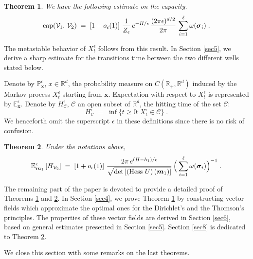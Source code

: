 \documentclass[reqno]{amsart}
\newtheorem{theorem}{Theorem}[section]
\newcounter{as}[section]
\newcommand{\mc}[1]{{\mathcal #1}}
\newcommand{\bb}[1]{{\mathbb #1}}
\newcommand{\bs}[1]{{\boldsymbol #1}}
\newcommand{\<}{\langle}
\renewcommand{\>}{\rangle}
\begin{document}
\begin{theorem}
\label{thmp1}
We have the following estimate on the capacity.
\begin{equation}
\label{cap}
\textup{cap}(\mc{V}_{1},\,\mc{V}_{2})\;=\;\left[1+o_{\epsilon}(1)\right]\,
\frac 1{Z_{\epsilon}}\, e^{-H/\epsilon}\, \frac{(2\pi \epsilon)^{d/2}}{2\pi}\,
\sum_{i=1}^{\ell}\omega(\bs{\sigma}_{i})\;.
\end{equation}
\end{theorem}

The metastable behavior of $X_{t}^{\epsilon}$ follows from this
result. In Section \ref{sec5}, we derive a sharp estimate for the
transitions time between the two different wells stated below.

Denote by $\bb P_\bs x^\epsilon$, $x\in \bb R^d$, the probability
measure on $C(\bb R_+, \bb R^d)$ induced by the Markov process $X
^{\epsilon}_t$ starting from $\bs x$. Expectation with respect to
$X_t^\epsilon$ is represented by $\bb E_\bs x^\epsilon$. Denote by
$H_\mc C^\epsilon$, $\mc C$ an open subset of $\bb R^d$, the hitting
time of the set $\mc C$:
\begin{equation}
\label{hitt}
H_\mc C^\epsilon \;=\; \inf\{t\ge 0 : X_t^\epsilon \in \mc C\}\;.
\end{equation}
We henceforth omit the superscript $\epsilon$ in these definitions
since there is no risk of confusion.

\begin{theorem}
\label{thmp2}
Under the notations above,
\begin{equation}
\label{2-4}
\bb{E}_{\bs{m}_{1}}^\epsilon\left[H_{\mc{V}_{2}}\right]\;=\;
\left[1+o_{\epsilon}(1)\right]\, \frac{2\pi \,
  e^{(H-h_{1})/\epsilon}}
{\sqrt{\det\left[(\text{\rm Hess }U)\, (\bs{m}_{1})\right]}}\,
\Big(\sum_{i=1}^{\ell}\omega(\bs{\sigma}_{i})\Big)^{-1}\;.
\end{equation}
\end{theorem}

The remaining part of the paper is devoted to provide a detailed proof
of Theorems \ref{thmp1} and \ref{thmp2}. In Section \ref{sec4}, we
prove Theorem \ref{thmp1} by constructing vector fields which
approximate the optimal ones for the Dirichlet's and the Thomson's
principles. The properties of these vector fields are derived in
Section \ref{sec6}, based on general estimates presented in Section
\ref{sec5}. Section \ref{sec8} is dedicated to Theorem \ref{thmp2}.

We close this section with some remarks on the last theorems.
\end{document}
